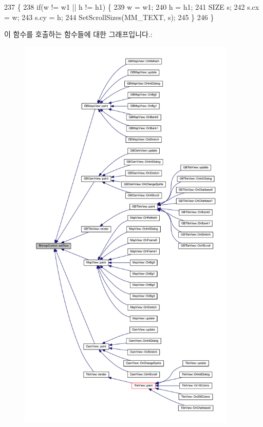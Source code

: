 \begin{DoxyCode}
237 \{
238   \textcolor{keywordflow}{if}(w != w1 || h != h1) \{
239     w = w1;
240     h = h1;
241     SIZE s;
242     s.cx = w;
243     s.cy = h;
244     SetScrollSizes(MM\_TEXT, s);
245   \}
246 \}
\end{DoxyCode}
이 함수를 호출하는 함수들에 대한 그래프입니다.\+:
\nopagebreak
\begin{figure}[H]
\begin{center}
\leavevmode
\includegraphics[height=550pt]{class_bitmap_control_a421004fe6ba01329dd69259396592d1f_icgraph}
\end{center}
\end{figure}
\mbox{\label{class_bitmap_control_ab545e15ea3edda9f0d80c0b8b0b7c812}} 
